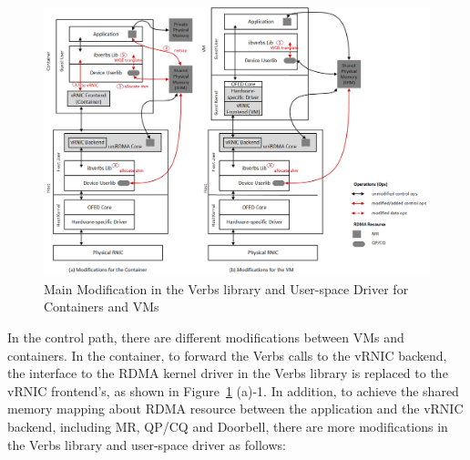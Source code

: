 \begin{figure}[!ht]
	\centering
	\includegraphics[width=1.0\linewidth]{images/verbs-driver}
	\caption{Main Modification in the Verbs library and User-space Driver for Containers and VMs}
	\label{fig:verbs-driver}
\end{figure}

In the control path, there are different modifications between VMs and containers. In the container, to forward the Verbs calls to the vRNIC backend, the interface to the RDMA kernel driver in the Verbs library is replaced to the vRNIC frontend's, as shown in Figure~\ref{fig:verbs-driver} (a)-1. In addition, to achieve the shared memory mapping about RDMA resource  between the application and the vRNIC backend, including MR, QP/CQ and Doorbell, there are more modifications in the Verbs library and user-space driver as follows:

